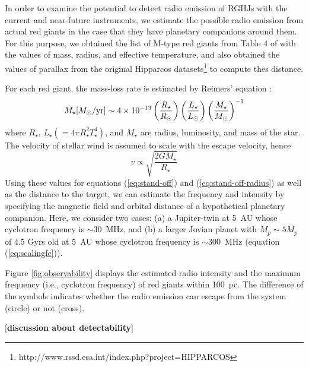 \documentclass{emulateapj}
\def\memoYF#1{\color{red}$[${\bf #1}$]$ \color{black}}
\begin{document}
In order to examine the potential to detect radio emission of RGHJs with the current and near-future instruments, we estimate the possible radio emission from actual red giants in the case that they have planetary companions around them. 
For this purpose, we obtained the list of M-type red giants from Table 4 of \citet{dumm1998} with the values of mass, radius, and effective temperature, and also obtained the values of parallax from the original Hipparcos datasets\footnote{http://www.rssd.esa.int/index.php?project=HIPPARCOS} to compute thes distance.

For each red giant, the mass-loss rate is estimated by Reimers' equation \citep{reimers1975}:
\begin{equation}
\dot M_{\star } [M_{\odot }{\rm /yr}] \sim 4 \times 10^{-13} \left( \frac{R_{\star }}{R_{\odot }} \right)\left( \frac{L_{\star }}{L_{\odot }} \right) \left( \frac{M_{\star }}{M_{\odot }} \right)^{-1}
\end{equation}
where $R_{\star }$, $L_{\star } (=4\pi R_{\star }^2 T_{\star }^4)$, and $M_{\star}$ are radius, luminosity, and mass of the star. 
The velocity of stellar wind is assumed to scale with the escape velocity, hence
\begin{equation}
v \propto \sqrt{\frac{2GM_{\star }}{R_{\star }}}
\end{equation}
Using these values for equations (\ref{eq:stand-off}) and (\ref{eq:stand-off-radius}) as well as the distance to the target, we can estimate the frequency and intensity by specifying the magnetic field and orbital distance of a hypothetical planetary companion. 
Here, we consider two cases: (a) a Jupiter-twin at 5~AU whose cyclotron frequency is $\sim 30$~MHz, and (b) a larger Jovian planet with $M_p\sim 5M_p$ of 4.5 Gyrs old at 5~AU whose cyclotron frequency is $\sim 300$~MHz (equation (\ref{eq:scalingfc})). 

Figure \ref{fig:observability} displays the estimated radio intensity and the maximum frequency (i.e., cyclotron frequency) of red giants within 100~pc.  
The difference of the symbols indicates whether the radio emission can escape from the system (circle) or not (cross). 


\memoYF{discussion about detectability}

\end{document}
